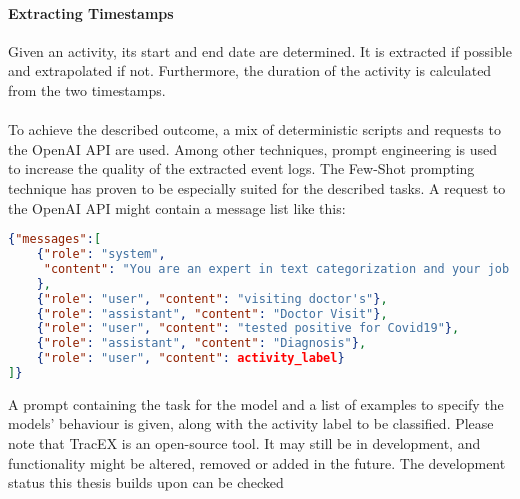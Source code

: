 \paragraph{Extracting Timestamps} Given an activity, its start and end date are determined. It is extracted if possible and extrapolated if not. Furthermore, the duration of the activity is calculated from the two timestamps.\\\\
To achieve the described outcome, a mix of deterministic scripts and requests to the OpenAI API are used. Among other techniques, prompt engineering is used to increase the quality of the extracted event logs.
The Few-Shot prompting technique has proven to be especially suited for the described tasks. A request to the OpenAI API might contain a message list like this:
\begin{lstlisting}[language=json, caption={Few-shot prompt to categorize activities into event types}, label={lst:few-shot}]
{"messages":[
	{"role": "system",  
     "content": "You are an expert in text categorization and your job is to take a given activity label and to classify it into one of the following event types: 'Symptom Onset', 'Symptom Offset', 'Diagnosis', 'Doctor Visit', 'Treatment', 'Hospital Admission', 'Hospital Discharge', 'Medication', 'Lifestyle Change' and 'Feelings'. Please consider the capitalization.",  
	},  
    {"role": "user", "content": "visiting doctor's"},  
    {"role": "assistant", "content": "Doctor Visit"},  
    {"role": "user", "content": "tested positive for Covid19"},
    {"role": "assistant", "content": "Diagnosis"},  
    {"role": "user", "content": activity_label}  
]}
\end{lstlisting}
A prompt containing the task for the model and a list of examples to specify the models' behaviour is given, along with the activity label to be classified.
Please note that TracEX is an open-source tool. It may still be in development, and functionality might be altered, removed or added in the future. The development status this thesis builds upon can be checked 
